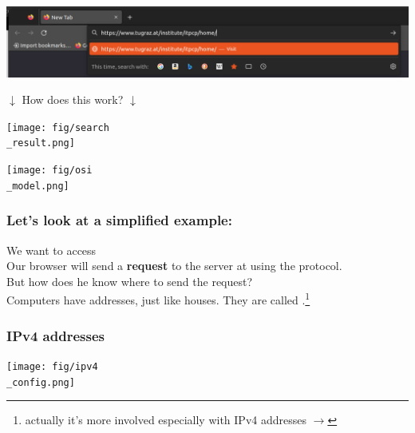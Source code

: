 \documentclass{beamer}
\begin{document}
\begin{frame}
  
  \begin{center}
    \includegraphics[width=\textwidth]{fig/search.png}
  \end{center}
  \begin{center}
    $\downarrow$ How does this work? $\downarrow$
  \end{center}
  \begin{center}
    \texttt{[image: fig/search\\\_result.png]}
  \end{center}
\end{frame}
\begin{frame}
  \begin{center}
    \texttt{[image: fig/osi\\\_model.png]}
  \end{center}
  \vspace{-6mm}
\end{frame}
\begin{frame}
  \frametitle{Let's look at a simplified example:}
  We want to access \texttt{}\\
  \vspace{5mm}
  Our browser will send a \textbf{request} to the server at \texttt{} using the \textbf{} protocol.\\
  \vspace{5mm}
  But how does he know where to send the request?\\
  \vspace{5mm}
  Computers have addresses, just like houses. They are called \textbf{}.\footnote[frame]{\tiny actually it's more involved especially with IPv4 addresses $\rightarrow$ }\\ %
\end{frame}
\begin{frame}
  \frametitle{IPv4 addresses}
  \begin{center}
    \texttt{[image: fig/ipv4\\\_config.png]}
  \end{center}
  \vspace{-6mm}
\end{frame}
\end{document}
